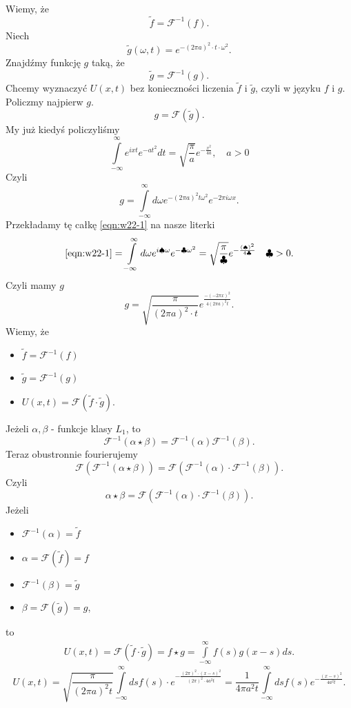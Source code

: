\documentclass[../main.tex]{subfiles}
\begin{document}
Wiemy, że
\[
    \tilde f = \mathcal{F}^{-1}(f).
\]
Niech
\[
    \tilde g(\omega, t) = e^{-(2\pi a)^2 \cdot t \cdot \omega^2}.
\]
Znajdźmy funkcję $g$ taką, że
\[
    \tilde g = \mathcal{F}^{-1}(g)
.\]
Chcemy wyznaczyć $U(x,t)$ bez konieczności liczenia $\tilde f$ i $\tilde g$, czyli w języku $f$ i $g$. Policzmy najpierw $g$.
\[
    g = \mathcal{F}(\tilde g)
.\]
My już kiedyś policzyliśmy
\begin{equation}
    \label{eqn:w22-1}
    \int\limits_{-\infty}^{\infty} e^{ixt}e^{-at^2}dt = \sqrt{\frac{\pi}{a}} e^{-\frac{x^2}{4a}},\quad a > 0\tag{$\Delta$}
\end{equation}
Czyli
\[
    g = \int\limits_{-\infty}^{\infty} d\omega e^{-\left( 2\pi a \right)^2 t \omega^2}e^{-2\pi i \omega x}
.\]
Przekładamy tę całkę \eqref{eqn:w22-1} na nasze literki
\[
    \eqref{eqn:w22-1} = \int\limits_{-\infty}^{\infty} d\omega e^{i \spadesuit\omega}e^{-\clubsuit \omega^2} = \sqrt{\frac{\pi}{\clubsuit}}e^{-\frac{(\spadesuit)^2}{4\clubsuit}}\quad \clubsuit > 0
.\]
Czyli mamy $g$
\[
    g = \sqrt{\frac{\pi}{(2\pi a)^2 \cdot t}}e^{\frac{-(-2\pi x)^2}{4(2\pi a)^2t}}
.\]
Wiemy, że
\begin{itemize}
    \item $\tilde f = \mathcal{F}^{-1}(f)$
    \item $\tilde g = \mathcal{F}^{-1}(g)$
    \item $U(x,t) = \mathcal{F}(\tilde f \cdot \tilde g)$.
\end{itemize}
Jeżeli $\alpha, \beta$ - funkcje klasy $L_1$, to
\[
    \mathcal{F}^{-1}(\alpha\star\beta) = \mathcal{F}^{-1}(\alpha)\mathcal{F}^{-1}(\beta)
.\]
Teraz obustronnie fourierujemy
\[
    \mathcal{F}\left( \mathcal{F}^{-1}(\alpha\star \beta) \right) = \mathcal{F}\left( \mathcal{F}^{-1}(\alpha)\cdot \mathcal{F}^{-1}(\beta) \right)
.\]
Czyli
\[
    \alpha\star \beta = \mathcal{F}\left( \mathcal{F}^{-1}(\alpha)\cdot \mathcal{F}^{-1}(\beta) \right)
.\]
Jeżeli
\begin{itemize}
    \item $\mathcal{F}^{-1}(\alpha) = \tilde f$
    \item $\alpha = \mathcal{F}(\tilde f) = f$
    \item $\mathcal{F}^{-1}(\beta) = \tilde g$
    \item $\beta = \mathcal{F}(\tilde g) = g$,
\end{itemize}
to
\begin{align*}
    U(x,t) = \mathcal{F}(\tilde f\cdot \tilde g) = f\star g = \int\limits_{-\infty}^{\infty} f(s)g(x-s)ds
.\end{align*}
\[
    U(x,t) = \sqrt{\frac{\pi}{(2\pi a)^2t}} \int\limits_{-\infty}^{\infty} ds f(s)\cdot e^{- \frac{(2\pi)^2\cdot (x-s)^2}{(2\pi)^2\cdot 4a^2t}} = \frac{1}{4 \pi a^2 t}\int\limits_{-\infty}^{\infty} ds f(s) e^{-\frac{(x-s)^2}{4a^2 t}}
.\]
\end{document}
